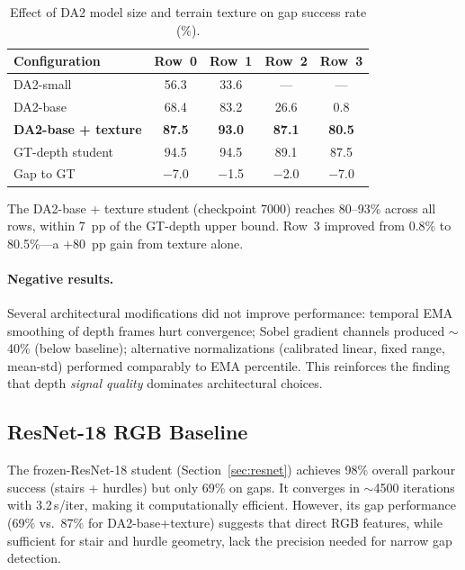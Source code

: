 \documentclass[10pt,twocolumn]{article}
\begin{document}
\begin{table}[h]
  \centering
  \caption{Effect of DA2 model size and terrain texture on gap
  success rate (\%).}
  \label{tab:da2_main}
  \small
  \begin{tabular}{@{}lcccc@{}}
    \toprule
    Configuration & Row~0 & Row~1 & Row~2 & Row~3 \\
    \midrule
    DA2-small & 56.3 & 33.6 & --- & --- \\
    DA2-base & 68.4 & 83.2 & 26.6 & 0.8 \\
    \textbf{DA2-base + texture} & \textbf{87.5} & \textbf{93.0} & \textbf{87.1} & \textbf{80.5} \\
    \midrule
    GT-depth student & 94.5 & 94.5 & 89.1 & 87.5 \\
    Gap to GT & $-$7.0 & $-$1.5 & $-$2.0 & $-$7.0 \\
    \bottomrule
  \end{tabular}
\end{table}

The DA2-base + texture student (checkpoint 7000) reaches 80--93\%
across all rows, within 7~pp of the GT-depth upper bound.  Row~3
improved from 0.8\% to 80.5\%---a +80~pp gain from texture alone.

\paragraph{Negative results.}
Several architectural modifications did not improve performance:
temporal EMA smoothing of depth frames hurt convergence;
Sobel gradient channels produced $\sim$40\% (below baseline);
alternative normalizations (calibrated linear, fixed range, mean-std)
performed comparably to EMA percentile.  This reinforces the finding
that depth \emph{signal quality} dominates architectural choices.

\subsection{ResNet-18 RGB Baseline}

The frozen-ResNet-18 student (Section~\ref{sec:resnet}) achieves
98\% overall parkour success (stairs + hurdles) but only 69\% on
gaps.  It converges in $\sim$4500 iterations with 3.2\,s/iter, making
it computationally efficient.  However, its gap performance
(69\% vs.\ 87\% for DA2-base+texture) suggests that direct RGB
features, while sufficient for stair and hurdle geometry, lack the
precision needed for narrow gap detection.
\end{document}
